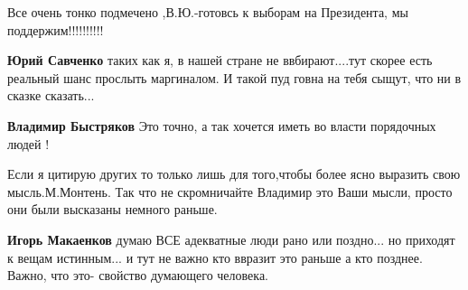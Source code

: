\begin{itemize}
 
Все очень тонко подмечено ,В.Ю.-готовсь к выборам на Президента, мы поддержим!!!!!!!!!!

\begin{itemize}

 
\textbf{Юрий Савченко} таких как я, в нашей стране не ввбирают....тут скорее
есть реальный шанс прослыть маргиналом. И такой пуд говна на тебя сыщут, что ни
в сказке сказать...

 
\textbf{Владимир Быстряков} Это точно, а так хочется иметь во власти порядочных людей !
\end{itemize}

 

Если я цитирую других то только лишь для того,чтобы более ясно выразить свою
мысль.М.Монтень. Так что не скромничайте Владимир это Ваши мысли, просто они
были высказаны немного раньше.

\begin{itemize}
 
\textbf{Игорь Макаенков} думаю ВСЕ адекватные люди рано или поздно... но
приходят к вещам истинным... и тут не важно кто ввразит это раньше а кто
позднее. Важно, что это- свойство думающего человека.
\end{itemize}


\end{itemize}
